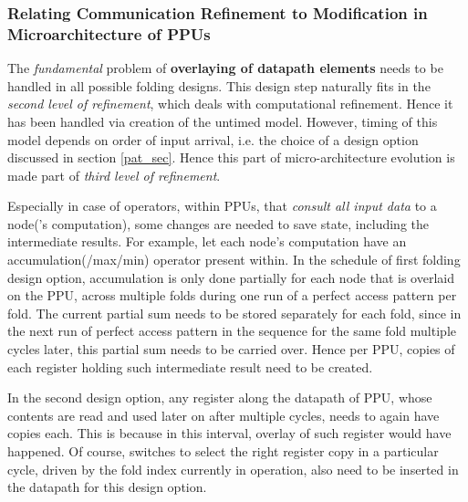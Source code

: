 \documentclass[12pt]{article}
\begin{document}
\subsubsection{Relating Communication Refinement to Modification in
Microarchitecture of PPUs}
\label{micro_mod_sec}
The \textit{fundamental} problem of \textbf{overlaying of datapath
elements} needs to be handled in all possible folding designs.
This design step naturally fits in the \textit{second level of refinement}, which
deals with computational refinement. Hence it has been handled via
creation of the untimed model. However, timing of this model depends on order of input arrival,
i.e. the choice of a design option discussed in section \ref{pat_sec}. Hence this part of micro-architecture evolution is
made part of \textit{third level of refinement}.

Especially in case of operators, within PPUs, that \textit{consult all
input data} to a node('s computation), some changes are needed to
save state, including the intermediate results. For example, let each node's
computation have an accumulation(/max/min) operator present
within. In the schedule of first folding design option, accumulation is only
done partially for each node that is overlaid on the PPU,
across multiple folds during one run of a perfect access pattern per fold.
The current
partial sum needs to be stored separately for each fold, since in the next
run of perfect access pattern in the sequence for
the same fold multiple cycles later, this partial sum needs to
be carried over. Hence per PPU,  copies of each register
holding such intermediate result need to be created.

In the second design option, any register along the
datapath of PPU, whose contents are read and used later
on after multiple cycles, needs to  again have 
copies each. This is because in this interval, overlay of such register
would have happened. Of course, switches to select the right register
copy in a particular cycle, driven by the fold index
currently in operation, also need to be inserted in the datapath for this
design option.
\end{document}
